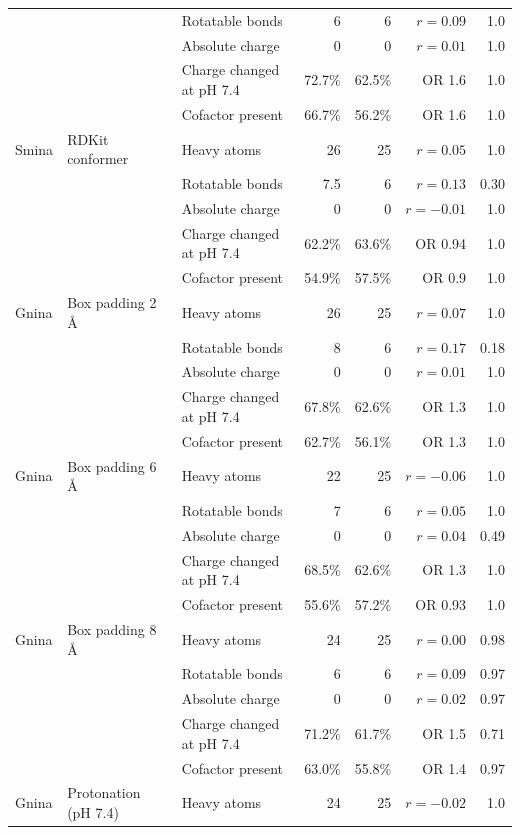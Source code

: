 \begin{longtable}{lllrrrr}
 &  & Rotatable bonds & 6 & 6 & $r = 0.09$ & 1.0 \\
 &  & Absolute charge & 0 & 0 & $r = 0.01$ & 1.0 \\
 &  & Charge changed at pH 7.4 & 72.7\% & 62.5\% & OR 1.6 & 1.0 \\
 &  & Cofactor present & 66.7\% & 56.2\% & OR 1.6 & 1.0 \\
\addlinespace
Smina & RDKit conformer & Heavy atoms & 26 & 25 & $r = 0.05$ & 1.0 \\
 &  & Rotatable bonds & 7.5 & 6 & $r = 0.13$ & 0.30 \\
 &  & Absolute charge & 0 & 0 & $r = -0.01$ & 1.0 \\
 &  & Charge changed at pH 7.4 & 62.2\% & 63.6\% & OR 0.94 & 1.0 \\
 &  & Cofactor present & 54.9\% & 57.5\% & OR 0.9 & 1.0 \\
\addlinespace
Gnina & Box padding 2 \AA{} & Heavy atoms & 26 & 25 & $r = 0.07$ & 1.0 \\
 &  & Rotatable bonds & 8 & 6 & $r = 0.17$ & 0.18 \\
 &  & Absolute charge & 0 & 0 & $r = 0.01$ & 1.0 \\
 &  & Charge changed at pH 7.4 & 67.8\% & 62.6\% & OR 1.3 & 1.0 \\
 &  & Cofactor present & 62.7\% & 56.1\% & OR 1.3 & 1.0 \\
\addlinespace
Gnina & Box padding 6 \AA{} & Heavy atoms & 22 & 25 & $r = -0.06$ & 1.0 \\
 &  & Rotatable bonds & 7 & 6 & $r = 0.05$ & 1.0 \\
 &  & Absolute charge & 0 & 0 & $r = 0.04$ & 0.49 \\
 &  & Charge changed at pH 7.4 & 68.5\% & 62.6\% & OR 1.3 & 1.0 \\
 &  & Cofactor present & 55.6\% & 57.2\% & OR 0.93 & 1.0 \\
\addlinespace
Gnina & Box padding 8 \AA{} & Heavy atoms & 24 & 25 & $r = 0.00$ & 0.98 \\
 &  & Rotatable bonds & 6 & 6 & $r = 0.09$ & 0.97 \\
 &  & Absolute charge & 0 & 0 & $r = 0.02$ & 0.97 \\
 &  & Charge changed at pH 7.4 & 71.2\% & 61.7\% & OR 1.5 & 0.71 \\
 &  & Cofactor present & 63.0\% & 55.8\% & OR 1.4 & 0.97 \\
\addlinespace
Gnina & Protonation (pH 7.4) & Heavy atoms & 24 & 25 & $r = -0.02$ & 1.0 \\

\end{longtable}
